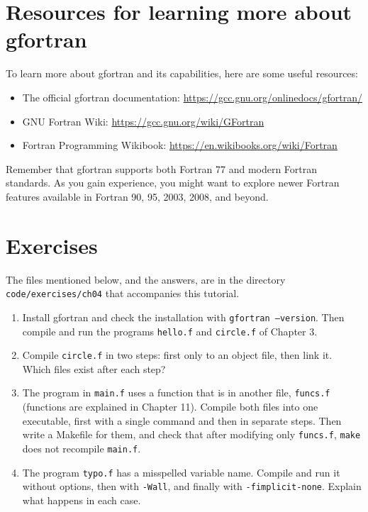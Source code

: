 \section{Resources for learning more about gfortran}

To learn more about gfortran and its capabilities, here are some useful resources:

\begin{itemize}
    \item The official gfortran documentation: \url{https://gcc.gnu.org/onlinedocs/gfortran/}
    \item GNU Fortran Wiki: \url{https://gcc.gnu.org/wiki/GFortran}
    \item Fortran Programming Wikibook: \url{https://en.wikibooks.org/wiki/Fortran}
\end{itemize}

Remember that gfortran supports both Fortran 77 and modern Fortran standards. As you gain experience, you might want to explore newer Fortran features available in Fortran 90, 95, 2003, 2008, and beyond.

\section{Exercises}

The files mentioned below, and the answers, are in the directory \texttt{code/exercises/ch04} that accompanies this tutorial.

\begin{enumerate}
    \item Install gfortran and check the installation with \texttt{gfortran --version}. Then compile and run the programs \texttt{hello.f} and \texttt{circle.f} of Chapter 3.
    \item Compile \texttt{circle.f} in two steps: first only to an object file, then link it. Which files exist after each step?
    \item The program in \texttt{main.f} uses a function that is in another file, \texttt{funcs.f} (functions are explained in Chapter 11). Compile both files into one executable, first with a single command and then in separate steps. Then write a Makefile for them, and check that after modifying only \texttt{funcs.f}, \texttt{make} does not recompile \texttt{main.f}.
    \item The program \texttt{typo.f} has a misspelled variable name. Compile and run it without options, then with \texttt{-Wall}, and finally with \texttt{-fimplicit-none}. Explain what happens in each case.
\end{enumerate}
